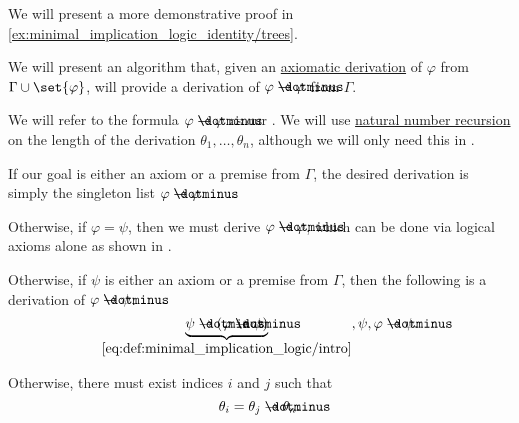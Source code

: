 \begin{comments}
  \item We will present a more demonstrative proof in \eqref{ex:minimal_implication_logic_identity/trees}.
\end{comments}

\begin{algorithm}\label{alg:derivation_conclusion_hypothesis_introduction}
  We will present an algorithm that, given an \hyperref[def:axiomatic_derivation]{axiomatic derivation} of \( \varphi \) from \( \Gamma \cup \set{ \varphi } \), will provide a derivation of \( \varphi \synimplies \varphi \) from \( \Gamma \).

  We will refer to the formula \( \varphi \synimplies \varphi \) as our . We will use \hyperref[rem:natural_number_recursion]{natural number recursion} on the length of the derivation \( \theta_1, \ldots, \theta_n \), although we will only need this in .

  \begin{thmenum}
     If our goal is either an axiom or a premise from \( \Gamma \), the desired derivation is simply the singleton list \( \varphi \synimplies \varphi \).

     Otherwise, if \( \varphi = \psi \), then we must derive \( \varphi \synimplies \varphi \), which can be done via logical axioms alone as shown in .

     Otherwise, if \( \psi \) is either an axiom or a premise from \( \Gamma \), then the following is a derivation of \( \varphi \synimplies \psi \):
    \begin{equation*}
      \underbrace{\psi \synimplies (\varphi \synimplies \psi)}_{\eqref{eq:def:minimal_implication_logic/intro}},
      \psi,
      \varphi \synimplies \psi.
    \end{equation*}

     Otherwise, there must exist indices \( i \) and \( j \) such that
    \begin{equation*}
      \theta_i = \theta_j \synimplies \theta_n.
    \end{equation*}


\end{thmenum}
\end{algorithm}
